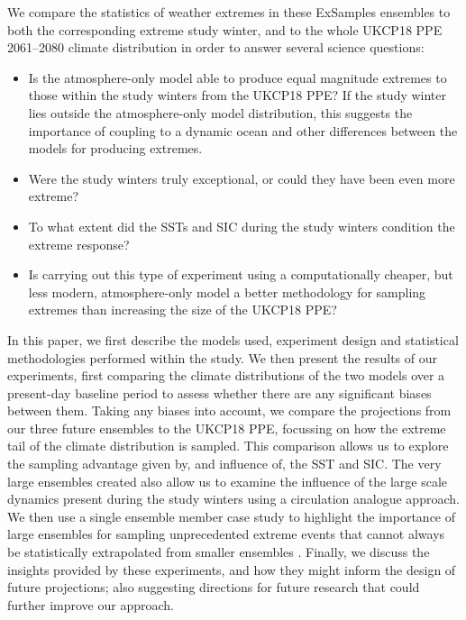   We compare the statistics of weather extremes in these ExSamples ensembles to both the corresponding extreme study winter, and to the whole UKCP18 PPE 2061--2080 climate distribution in order to answer several science questions:

  \begin{itemize}
    \item Is the atmosphere-only model able to produce equal magnitude extremes to those within the study winters from the UKCP18 PPE? If the study winter lies outside the atmosphere-only model distribution, this suggests the importance of coupling to a dynamic ocean and other differences between the models for producing extremes.
    \item Were the study winters truly exceptional, or could they have been even more extreme? 
    \item To what extent did the SSTs and SIC during the study winters condition the extreme response?
    \item Is carrying out this type of experiment using a computationally cheaper, but less modern, atmosphere-only model a better methodology for sampling extremes than increasing the size of the UKCP18 PPE?
  \end{itemize}

  In this paper, we first describe the models used, experiment design and statistical methodologies performed within the study. We then present the results of our experiments, first comparing the climate distributions of the two models over a present-day baseline period to assess whether there are any significant biases between them. Taking any biases into account, we compare the projections from our three future ensembles to the UKCP18 PPE, focussing on how the extreme tail of the climate distribution is sampled. This comparison allows us to explore the sampling advantage given by, and influence of, the SST and SIC. The very large ensembles created also allow us to examine the influence of the large scale dynamics present during the study winters using a circulation analogue approach. We then use a single ensemble member case study to highlight the importance of large ensembles for sampling unprecedented extreme events that cannot always be statistically extrapolated from smaller ensembles \citep{fischer_increasing_2021,gessner_very_2021}. Finally, we discuss the insights provided by these experiments, and how they might inform the design of future projections; also suggesting directions for future research that could further improve our approach.

